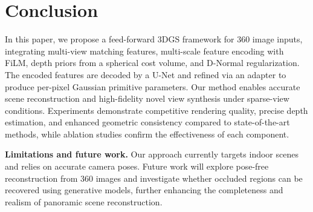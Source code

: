 \section{Conclusion}\label{sec:conclusion}
In this paper, we propose a feed-forward 3DGS framework for 360 image inputs, integrating multi-view matching features, multi-scale feature encoding with FiLM, depth priors from a spherical cost volume, and D-Normal regularization. The encoded features are decoded by a U-Net and refined via an adapter to produce per-pixel Gaussian primitive parameters. Our method enables accurate scene reconstruction and high-fidelity novel view synthesis under sparse-view conditions. Experiments demonstrate competitive rendering quality, precise depth estimation, and enhanced geometric consistency compared to state-of-the-art methods, while ablation studies confirm the effectiveness of each component.


\textbf{Limitations and future work.} Our approach currently targets indoor scenes and relies on accurate camera poses. Future work will explore pose-free reconstruction from 360 images and investigate whether occluded regions can be recovered using generative models, further enhancing the completeness and realism of panoramic scene reconstruction.